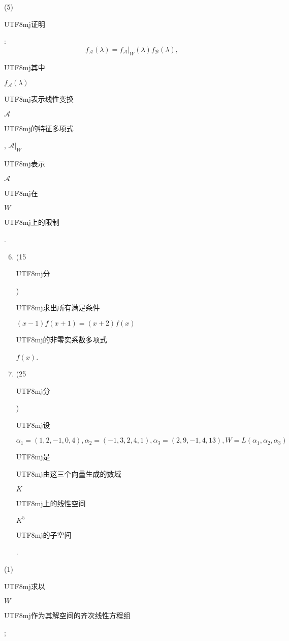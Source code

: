 \documentclass[10pt]{article}
\begin{document}
(5) \begin{CJK}{UTF8}{mj}证明\end{CJK}:
$$
f_{\mathscr{A}}(\lambda)=\left.f_{\mathscr{A}}\right|_{W}(\lambda) f_{\mathscr{B}}(\lambda),
$$
\begin{CJK}{UTF8}{mj}其中\end{CJK} $f_{\mathscr{A}}(\lambda)$ \begin{CJK}{UTF8}{mj}表示线性变换\end{CJK} $\mathscr{A}$ \begin{CJK}{UTF8}{mj}的特征多项式\end{CJK}, $\left.\mathscr{A}\right|_{W}$ \begin{CJK}{UTF8}{mj}表示\end{CJK} $\mathscr{A}$ \begin{CJK}{UTF8}{mj}在\end{CJK} $W$ \begin{CJK}{UTF8}{mj}上的限制\end{CJK}.

\begin{enumerate}
  \setcounter{enumi}{5}
  \item (15 \begin{CJK}{UTF8}{mj}分\end{CJK}) \begin{CJK}{UTF8}{mj}求出所有满足条件\end{CJK} $(x-1) f(x+1)=(x+2) f(x)$ \begin{CJK}{UTF8}{mj}的非零实系数多项式\end{CJK} $f(x)$.

  \item (25 \begin{CJK}{UTF8}{mj}分\end{CJK}) \begin{CJK}{UTF8}{mj}设\end{CJK} $\alpha_{1}=(1,2,-1,0,4), \alpha_{2}=(-1,3,2,4,1), \alpha_{3}=(2,9,-1,4,13), W=L\left(\alpha_{1}, \alpha_{2}, \alpha_{3}\right)$ \begin{CJK}{UTF8}{mj}是\end{CJK} \begin{CJK}{UTF8}{mj}由这三个向量生成的数域\end{CJK} $K$ \begin{CJK}{UTF8}{mj}上的线性空间\end{CJK} $K^{5}$ \begin{CJK}{UTF8}{mj}的子空间\end{CJK}.

\end{enumerate}
(1) \begin{CJK}{UTF8}{mj}求以\end{CJK} $W$ \begin{CJK}{UTF8}{mj}作为其解空间的齐次线性方程组\end{CJK};
\end{document}
